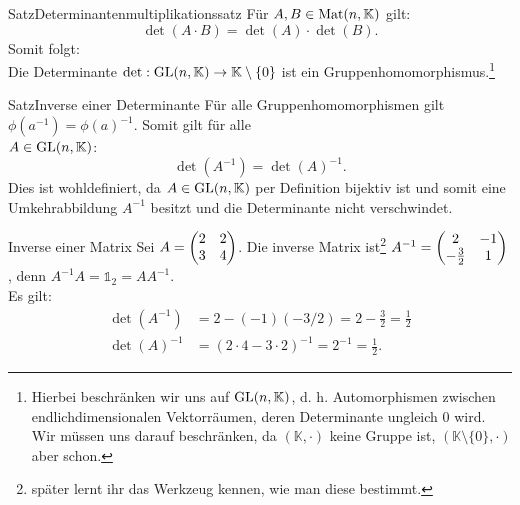 \begin{Satz}
{Satz}{Determinantenmultiplikationssatz}
Für $A,B\in\text{Mat}(n,\mathbb{K})$ gilt:
\begin{equation}
    \boxed{\det(A\cdot B)=\det (A)\cdot\det(B)}.
\end{equation}
Somit folgt:\\
Die Determinante $\det:\text{GL}(n,\mathbb{K})\to\mathbb{K}\setminus\{0\}$ ist ein Gruppenhomomorphismus.\footnote{Hierbei beschränken wir uns auf $\text{GL}(n,\mathbb{K})$, d. h. Automorphismen zwischen endlichdimensionalen Vektorräumen, deren Determinante ungleich 0 wird. Wir müssen uns darauf beschränken, da $(\mathbb{K},\cdot)$ keine Gruppe ist, $(\mathbb{K}\setminus\{0\},\cdot)$ aber schon.}
\end{Satz}
\begin{Satz}
{Satz}{Inverse einer Determinante}
Für alle Gruppenhomomorphismen gilt $\phi(a^{-1})=\phi(a)^{-1}$. Somit gilt für alle\\
$A\in\text{GL}(n,\mathbb{K})$:
\begin{equation}
    \det(A^{-1})=\det(A)^{-1}.
\end{equation}
Dies ist wohldefiniert, da $A\in\text{GL}(n,\mathbb{K})$ per Definition bijektiv ist und somit eine Umkehrabbildung $A^{-1}$ besitzt und die Determinante nicht verschwindet.
\end{Satz}
\begin{Beispiel}
{Inverse einer Matrix}
Sei $A=\begin{pmatrix}2&2\\3&4\end{pmatrix}$. Die inverse Matrix ist\footnote{später lernt ihr das Werkzeug kennen, wie man diese bestimmt.} $A^{-1}=\begin{pmatrix}2&-1\\-\frac{3}{2}&1\end{pmatrix}$, denn $A^{-1}A=\mathds{1}_2=AA^{-1}$.\\
Es gilt:
\begin{align*}
    \det(A^{-1})&=2-(-1)(-3/2)=2-\frac{3}{2}=\frac{1}{2}\\
    \det(A)^{-1}&=(2\cdot 4-3\cdot 2)^{-1}=2^{-1}=\frac{1}{2}.
\end{align*}
\end{Beispiel}


